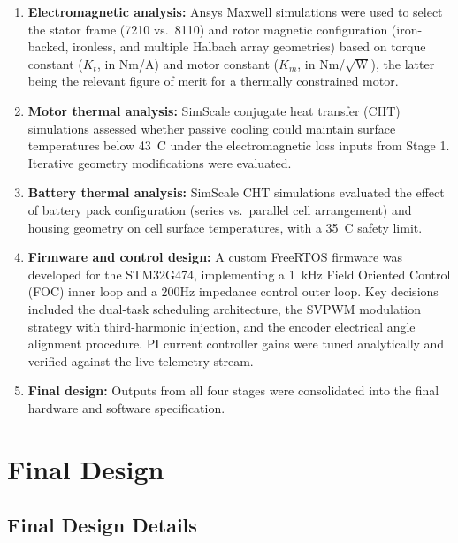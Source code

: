 \documentclass[11pt]{article}
\begin{document}
\begin{enumerate}
    \item \textbf{Electromagnetic analysis:} Ansys Maxwell simulations were used to select the stator frame (7210 vs.\ 8110) and rotor magnetic configuration (iron-backed, ironless, and multiple Halbach array geometries) based on torque constant ($K_t$, in Nm/A) and motor constant ($K_m$, in Nm/$\sqrt{\text{W}}$), the latter being the relevant figure of merit for a thermally constrained motor.

    \item \textbf{Motor thermal analysis:} SimScale conjugate heat transfer (CHT) simulations assessed whether passive cooling could maintain surface temperatures below 43~\textdegree{}C under the electromagnetic loss inputs from Stage 1. Iterative geometry modifications were evaluated.

    \item \textbf{Battery thermal analysis:} SimScale CHT simulations evaluated the effect of battery pack configuration (series vs.\ parallel cell arrangement) and housing geometry on cell surface temperatures, with a 35~\textdegree{}C safety limit.

    \item \textbf{Firmware and control design:} A custom FreeRTOS firmware was developed for the STM32G474, implementing a 1~kHz Field Oriented Control (FOC) inner loop and a 200Hz impedance control outer loop. Key decisions included the dual-task scheduling architecture, the SVPWM modulation strategy with third-harmonic injection, and the encoder electrical angle alignment procedure. PI current controller gains were tuned analytically and verified against the live telemetry stream.

    \item \textbf{Final design:} Outputs from all four stages were consolidated into the final hardware and software specification.

\end{enumerate}


\section{Final Design}

\subsection{Final Design Details}
\end{document}
